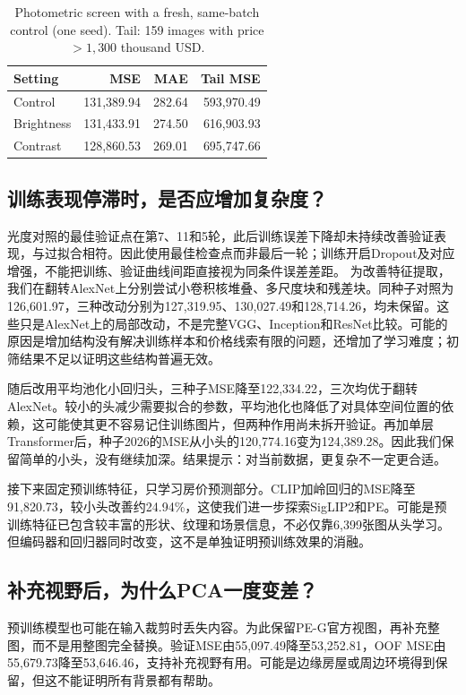 \documentclass[conference,a4paper]{IEEEtran}
\begin{document}
\begin{table}[t]
\caption{Photometric screen with a fresh, same-batch control (one seed). Tail: 159 images with price $>1,300$ thousand USD.}
\label{tab:photo}\centering\footnotesize
\setlength{\tabcolsep}{3pt}
\begin{tabularx}{\columnwidth}{Yrrr}\toprule
Setting & MSE & MAE & Tail MSE\\\midrule
Control &131,389.94&282.64&593,970.49\\
Brightness &131,433.91&274.50&616,903.93\\
Contrast &128,860.53&269.01&695,747.66\\\bottomrule
\end{tabularx}
\end{table}

\subsection{训练表现停滞时，是否应增加复杂度？}
光度对照的最佳验证点在第7、11和5轮，此后训练误差下降却未持续改善验证表现，与过拟合相符。因此使用最佳检查点而非最后一轮；训练开启Dropout及对应增强，不能把训练、验证曲线间距直接视为同条件误差差距。
为改善特征提取，我们在翻转AlexNet上分别尝试小卷积核堆叠、多尺度块和残差块。同种子对照为126,601.97，三种改动分别为127,319.95、130,027.49和128,714.26，均未保留。这些只是AlexNet上的局部改动，不是完整VGG、Inception和ResNet比较。可能的原因是增加结构没有解决训练样本和价格线索有限的问题，还增加了学习难度；初筛结果不足以证明这些结构普遍无效。

随后改用平均池化小回归头，三种子MSE降至122,334.22，三次均优于翻转AlexNet。较小的头减少需要拟合的参数，平均池化也降低了对具体空间位置的依赖，这可能使其更不容易记住训练图片，但两种作用尚未拆开验证。再加单层Transformer后，种子2026的MSE从小头的120,774.16变为124,389.28。因此我们保留简单的小头，没有继续加深。结果提示：对当前数据，更复杂不一定更合适。

接下来固定预训练特征，只学习房价预测部分。CLIP加岭回归的MSE降至91,820.73，较小头改善约24.94\%，这使我们进一步探索SigLIP2和PE。可能是预训练特征已包含较丰富的形状、纹理和场景信息，不必仅靠6,399张图从头学习。但编码器和回归器同时改变，这不是单独证明预训练效果的消融。

\subsection{补充视野后，为什么PCA一度变差？}
预训练模型也可能在输入裁剪时丢失内容。为此保留PE-G官方视图，再补充整图，而不是用整图完全替换。验证MSE由55,097.49降至53,252.81，OOF MSE由55,679.73降至53,646.46，支持补充视野有用。可能是边缘房屋或周边环境得到保留，但这不能证明所有背景都有帮助。
\end{document}
